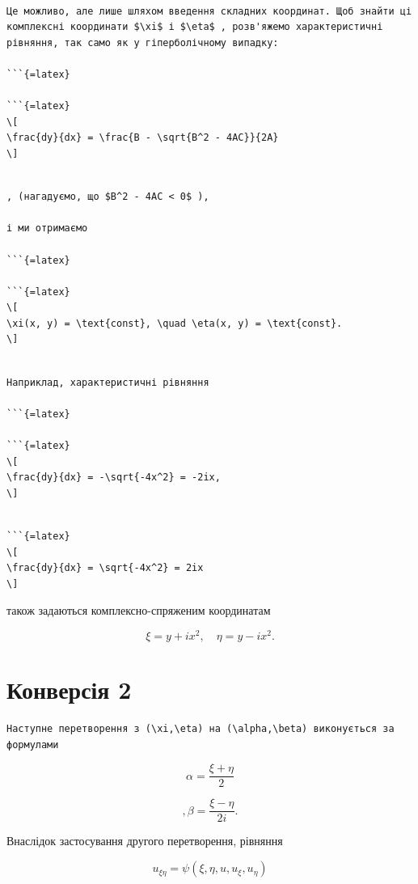 \documentclass[
]{article}
\begin{document}
\begin{verbatim}

Це можливо, але лише шляхом введення складних координат. Щоб знайти ці комплексні координати $\xi$ і $\eta$ , розв'яжемо характеристичні рівняння, так само як у гіперболічному випадку:

```{=latex}

```{=latex}
\[
\frac{dy}{dx} = \frac{B - \sqrt{B^2 - 4AC}}{2A}
\]
\end{verbatim}

\begin{verbatim}

, (нагадуємо, що $B^2 - 4AC < 0$ ),

і ми отримаємо

```{=latex}

```{=latex}
\[
\xi(x, y) = \text{const}, \quad \eta(x, y) = \text{const}.
\]
\end{verbatim}

\begin{verbatim}

Наприклад, характеристичні рівняння

```{=latex}

```{=latex}
\[
\frac{dy}{dx} = -\sqrt{-4x^2} = -2ix,
\]
\end{verbatim}

\begin{verbatim}

```{=latex}
\[
\frac{dy}{dx} = \sqrt{-4x^2} = 2ix
\]
\end{verbatim}

також задаються комплексно-спряженим координатам

\[
\xi = y + ix^2, \quad \eta = y - ix^2.
\]

\section{Конверсія
2}\label{ux43aux43eux43dux432ux435ux440ux441ux456ux44f-2}

\begin{verbatim}
Наступне перетворення з (\xi,\eta) на (\alpha,\beta) виконується за формулами
\end{verbatim}

\[
\alpha = \frac{\xi + \eta}{2}
\]

\[
, \beta = \frac{\xi - \eta}{2i} .
\]

Внаслідок застосування другого перетворення, рівняння

\[
u_{\xi\eta} = \psi(\xi, \eta, u, u_{\xi}, u_{\eta})
\]
\end{document}
